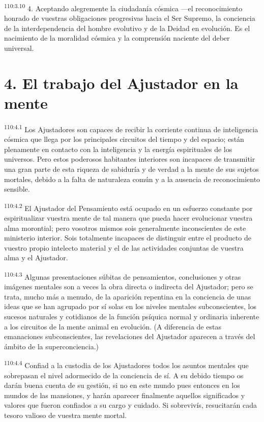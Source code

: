 \par
\textsuperscript{110:3.10} 4. Aceptando alegremente la ciudadanía cósmica ---el reconocimiento honrado de vuestras obligaciones progresivas hacia el Ser Supremo, la conciencia de la interdependencia del hombre evolutivo y de la Deidad en evolución. Es el nacimiento de la moralidad cósmica y la comprensión naciente del deber universal.

\section*{4. El trabajo del Ajustador en la mente}
\par
\textsuperscript{110:4.1} Los Ajustadores son capaces de recibir la corriente continua de inteligencia cósmica que llega por los principales circuitos del tiempo y del espacio; están plenamente en contacto con la inteligencia y la energía espirituales de los universos. Pero estos poderosos habitantes interiores son incapaces de transmitir una gran parte de esta riqueza de sabiduría y de verdad a la mente de sus sujetos mortales, debido a la falta de naturaleza común y a la ausencia de reconocimiento sensible.

\par
\textsuperscript{110:4.2} El Ajustador del Pensamiento está ocupado en un esfuerzo constante por espiritualizar vuestra mente de tal manera que pueda hacer evolucionar vuestra alma morontial; pero vosotros mismos sois generalmente inconscientes de este ministerio interior. Sois totalmente incapaces de distinguir entre el producto de vuestro propio intelecto material y el de las actividades conjuntas de vuestra alma y el Ajustador.

\par
\textsuperscript{110:4.3} Algunas presentaciones súbitas de pensamientos, conclusiones y otras imágenes mentales son a veces la obra directa o indirecta del Ajustador; pero se trata, mucho más a menudo, de la aparición repentina en la conciencia de unas ideas que se han agrupado por sí solas en los niveles mentales subconscientes, los sucesos naturales y cotidianos de la función psíquica normal y ordinaria inherente a los circuitos de la mente animal en evolución. (A diferencia de estas emanaciones subconscientes, las revelaciones del Ajustador aparecen a través del ámbito de la superconciencia.)

\par
\textsuperscript{110:4.4} Confiad a la custodia de los Ajustadores todos los asuntos mentales que sobrepasan el nivel adormecido de la conciencia de sí. A su debido tiempo os darán buena cuenta de su gestión, si no en este mundo pues entonces en los mundos de las mansiones, y harán aparecer finalmente aquellos significados y valores que fueron confiados a su cargo y cuidado. Si sobrevivís, resucitarán cada tesoro valioso de vuestra mente mortal.

